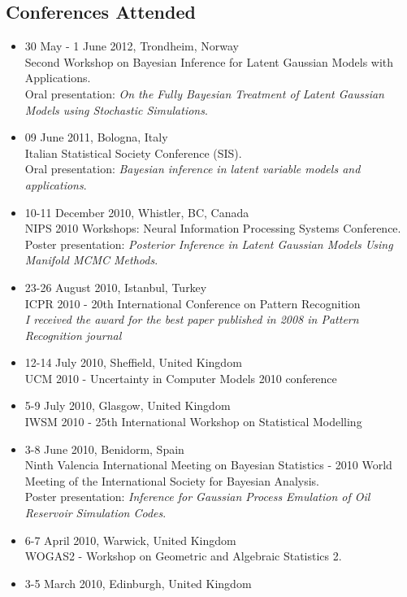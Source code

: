 \documentclass[a4paper,10pt]{article}
\begin{document}
\subsection*{Conferences Attended}
\begin{itemize}
\item 30 May - 1 June 2012, Trondheim, Norway \\
  Second Workshop on Bayesian Inference for Latent Gaussian Models with Applications.
  \\Oral presentation: \emph{On the Fully Bayesian Treatment of Latent Gaussian Models using Stochastic Simulations}.
\item 09 June 2011, Bologna, Italy \\
  Italian Statistical Society Conference (SIS).
  \\Oral presentation: \emph{Bayesian inference in latent variable models and applications}.
\item 10-11 December 2010, Whistler, BC, Canada \\
  NIPS 2010 Workshops: Neural Information Processing Systems Conference.
  \\Poster presentation: \emph{Posterior Inference in Latent Gaussian Models Using Manifold MCMC Methods}.
\item 23-26 August 2010, Istanbul, Turkey \\
  ICPR 2010 - 20th International Conference on Pattern Recognition
  \\\emph{I received the award for the best paper published in 2008 in Pattern Recognition journal}
\item 12-14 July 2010, Sheffield, United Kingdom \\
  UCM 2010 - Uncertainty in Computer Models 2010 conference
\item 5-9 July 2010, Glasgow, United Kingdom \\
  IWSM 2010 - 25th International Workshop on Statistical Modelling
\item 3-8 June 2010, Benidorm, Spain \\
  Ninth Valencia International Meeting on Bayesian Statistics - 2010 World Meeting of the International Society for Bayesian Analysis.
  \\Poster presentation: \emph{Inference for Gaussian Process Emulation of Oil Reservoir Simulation Codes}.
\item 6-7 April 2010, Warwick, United Kingdom \\
  WOGAS2 - Workshop on Geometric and Algebraic Statistics 2.
\item 3-5 March 2010, Edinburgh, United Kingdom \\

\end{itemize}
\end{document}
